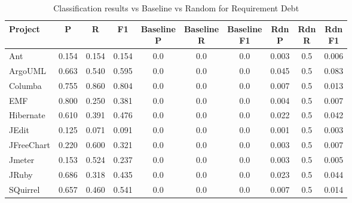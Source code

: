 \begin{table}[!hbt]
    \begin{center}
        \caption{Classification results vs Baseline vs Random for Requirement Debt}
        \label{tbl:classifier_results_vs_baseline_requirement}
        \begin{tabular}{l| c c c c c c c c c}
        \toprule
        \textbf{Project} & \textbf{P} & \textbf{R} & \textbf{F1} & \thead{Baseline\\P} & \thead{Baseline\\R} & \thead{Baseline\\F1} & \thead{Rdn\\P} & \thead{Rdn\\R} & \thead{Rdn\\F1} \\
        \midrule
        Ant           &  0.154 & 0.154 &  0.154 & 0.0 & 0.0 & 0.0 & 0.003 &  0.5 &  0.006 \\
        ArgoUML       &  0.663 & 0.540 &  0.595 & 0.0 & 0.0 & 0.0 & 0.045 &  0.5 &  0.083 \\
        Columba       &  0.755 & 0.860 &  0.804 & 0.0 & 0.0 & 0.0 & 0.007 &  0.5 &  0.013 \\
        EMF           &  0.800 & 0.250 &  0.381 & 0.0 & 0.0 & 0.0 & 0.004 &  0.5 &  0.007 \\
        Hibernate     &  0.610 & 0.391 &  0.476 & 0.0 & 0.0 & 0.0 & 0.022 &  0.5 &  0.042 \\
        JEdit         &  0.125 & 0.071 &  0.091 & 0.0 & 0.0 & 0.0 & 0.001 &  0.5 &  0.003 \\
        JFreeChart    &  0.220 & 0.600 &  0.321 & 0.0 & 0.0 & 0.0 & 0.003 &  0.5 &  0.007 \\
        Jmeter        &  0.153 & 0.524 &  0.237 & 0.0 & 0.0 & 0.0 & 0.003 &  0.5 &  0.005 \\
        JRuby         &  0.686 & 0.318 &  0.435 & 0.0 & 0.0 & 0.0 & 0.023 &  0.5 &  0.044 \\
        SQuirrel      &  0.657 & 0.460 &  0.541 & 0.0 & 0.0 & 0.0 & 0.007 &  0.5 &  0.014 \\
        \bottomrule
        \end{tabular}
    \end{center}    
\end{table}

\clearpage


